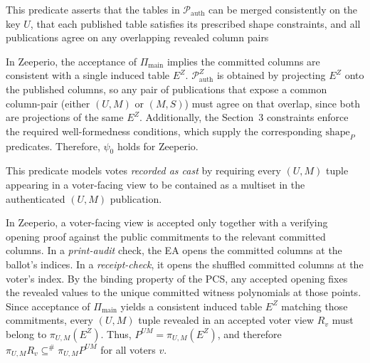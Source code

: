 
This predicate asserts that the tables in $\mathcal{P}_{\mathrm{auth}}$ can be merged consistently
on the key $U$, that each published table satisfies its prescribed shape constraints, and all publications agree on any overlapping revealed column pairs

In Zeeperio, the acceptance of $\Pi_{\mathrm{main}}$ implies the committed columns are consistent with a single induced table $E^Z$.
$\mathcal{P}_{\mathrm{auth}}^Z$ is obtained by projecting $E^Z$ onto the published columns, so any pair of publications that expose a common column-pair (either
$(U,M)$ or $(M,S)$) must agree on that overlap, since both are projections of the same $E^Z$.
Additionally, the Section~3 constraints enforce the
required well-formedness conditions, which supply the corresponding
$\mathrm{shape}_P$ predicates.
Therefore, $\psi_0$ holds for Zeeperio.



This predicate models votes \emph{recorded as cast} by requiring every $(U,M)$ tuple appearing in a voter-facing view
to be contained as a multiset in the authenticated $(U,M)$ publication.

In Zeeperio, a voter-facing view is accepted only together with a verifying opening proof against the
public commitments to the relevant committed columns. In a \emph{print-audit} check, the EA
opens the committed columns at the ballot's indices. In a \emph{receipt-check}, it opens the shuffled committed
columns at the voter’s index. By the binding property of the PCS, any accepted opening
fixes the revealed values to the unique committed witness polynomials at those points.
Since acceptance of $\Pi_{\mathrm{main}}$ yields a consistent induced table $E^Z$ matching those commitments, every $(U,M)$ tuple
revealed in an accepted voter view $R_v$ must belong to $\pi_{U,M}(E^Z)$.
Thus, $P^{UM}=\pi_{U,M}(E^Z)$, and therefore $\pi_{U,M}R_v \subseteq^{\#} \pi_{U,M}P^{UM}$ for all voters $v$.


